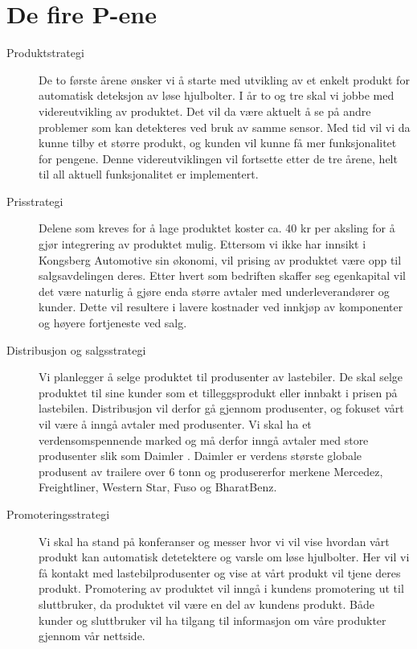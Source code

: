 \section{De fire P-ene}
\begin{description}
	\item[Produktstrategi] De to første årene ønsker vi å starte med utvikling av et enkelt produkt for 		automatisk deteksjon av løse hjulbolter. I år to og tre skal vi jobbe med videreutvikling av 				produktet. Det vil da være aktuelt å se på andre problemer som kan detekteres ved bruk av 			samme sensor. Med tid vil vi da kunne tilby et større produkt, og kunden vil kunne få mer 			funksjonalitet for pengene. Denne videreutviklingen vil fortsette etter de tre årene, helt til all aktuell 		funksjonalitet er implementert.
	\item[Prisstrategi] Delene som kreves for å lage produktet koster ca. 40 kr per aksling for å gjør integrering av produktet mulig. Ettersom vi ikke har innsikt i Kongsberg Automotive sin økonomi, vil prising av produktet være opp til salgsavdelingen deres. Etter hvert som bedriften skaffer seg egenkapital vil det være naturlig å gjøre enda større avtaler med underleverandører og kunder. Dette vil resultere i lavere kostnader ved innkjøp av komponenter og høyere fortjeneste ved salg.
	\item[Distribusjon og salgsstrategi] Vi planlegger å selge produktet til produsenter av lastebiler. De 		skal selge produktet til sine kunder som et tilleggsprodukt eller innbakt i prisen på lastebilen. 			Distribusjon vil derfor gå gjennom produsenter, og fokuset vårt vil være å inngå avtaler med 			produsenter. Vi skal ha et verdensomspennende marked og må derfor inngå avtaler med store 		produsenter slik som Daimler \cite{daimler}. Daimler er verdens største globale produsent av 				trailere over 6 tonn og produsererfor merkene Mercedez, Freightliner, Western Star, Fuso og 			BharatBenz.
	\item[Promoteringsstrategi] Vi skal ha stand på konferanser og messer hvor vi vil vise hvordan vårt 	produkt kan automatisk detetektere og varsle om løse hjulbolter. Her vil vi få kontakt med 			lastebilprodusenter og vise at vårt produkt vil tjene deres produkt. Promotering av produktet vil 		inngå i kundens promotering ut til sluttbruker, da produktet vil være en del av kundens produkt. 		Både kunder og 	sluttbruker vil ha tilgang til informasjon om våre produkter gjennom vår nettside.
\end{description}
